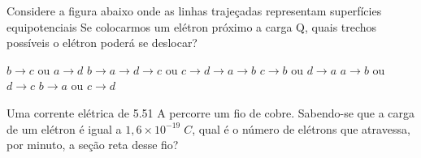 \documentclass[12pt, addpoints]{exam}
\begin{document}
        \begin{questions}
\begin{multicols*}{2}
\question Considere a figura abaixo onde as linhas trajeçadas representam superfícies equipotenciais Se colocarmos um elétron próximo a carga Q, quais trechos possíveis o elétron poderá se deslocar?
        
        \begin{center}
            \begin{minipage}[c]{0.5\linewidth}
            \end{minipage}
        \end{center}
        
        

\begin{choices}
\choice $b\rightarrow c$ ou $a\rightarrow d$ 
\choice $b\rightarrow a\rightarrow d\rightarrow c$ ou $c\rightarrow d\rightarrow a\rightarrow b$ 
\choice $c\rightarrow b$ ou $d\rightarrow a$ 
\choice $a\rightarrow b$ ou $d\rightarrow c$ 
\choice $b\rightarrow a$ ou $c\rightarrow d$ 
\end{choices}
\question Uma corrente elétrica de    5.51 A percorre um ﬁo de cobre. Sabendo-se que a carga de um elétron é igual a $1,6\times 10^{-19}\;C$, qual é o número de elétrons que atravessa, por minuto, a seção reta desse ﬁo?


\end{multicols*}
\end{questions}
\end{document}
